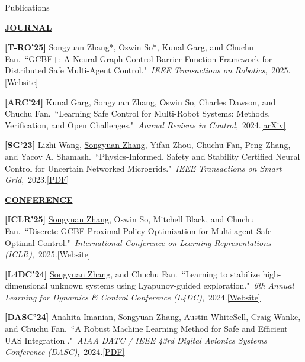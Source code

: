\documentclass{resume} %
\newcommand{\paperItem}[4]{#1.~``#2."~\textit{#3},~#4.}%
\newcommand{\me}{\underline{Songyuan Zhang}}
\newcommand{\meshort}{\textbf{S. Zhang}}
\newcommand{\person}[2]{#1}
\begin{document}
	\begin{rSection}{Publications}
		\item[] \textbf{\underline{JOURNAL}}
		\vspace{5pt}
		{
			\item {\bf [T-RO'25]}
			\paperItem{\person{\me*}{\meshort}, \person{Oswin So*}{O. So}, \person{Kunal Garg}{K. Garg}, and \person{Chuchu Fan}{C. Fan}}{GCBF+: A Neural Graph Control Barrier Function Framework for Distributed Safe Multi-Agent Control}{IEEE Transactions on Robotics}{2025}{\href{https://mit-realm.github.io/gcbfplus/}{[Website]}}
			\item {\bf [ARC'24]}
			\paperItem{\person{Kunal Garg}{K. Garg}, \person{\me}{\meshort}, \person{Oswin So}{O. So}, \person{Charles Dawson}{C. Dawson}, and \person{Chuchu Fan}{C. Fan}}{Learning Safe Control for Multi-Robot Systems: Methods, Verification, and Open Challenges}{Annual Reviews in Control}{2024}{\href{https://arxiv.org/abs/2311.13714}{[arXiv]}}
			\item {\bf [SG'23]}
			\paperItem{\person{Lizhi Wang}{L. Wang}, \person{\me}{\meshort}, \person{Yifan Zhou}{Y. Zhou}, \person{Chuchu Fan}{C. Fan}, \person{Peng Zhang}{P. Zhang}, and \person{Yacov A. Shamash}{YA. Shamash}}{Physics-Informed, Safety and Stability Certified Neural Control for Uncertain Networked Microgrids}{IEEE Transactions on Smart Grid}{2023}{\href{https://ieeexplore.ieee.org/stamp/stamp.jsp?arnumber=10233047}{[PDF]}}
		}
		\vspace{5pt}
		\item[] \textbf{\underline{CONFERENCE}}
		\vspace{5pt}
		{	
			\item {\bf [ICLR'25]}
			\paperItem{\person{\me}{\meshort}, \person{Oswin So}{O. So}, \person{Mitchell Black}{M. Black}, and \person{Chuchu Fan}{C. Fan}}{Discrete GCBF Proximal Policy Optimization for Multi-agent Safe Optimal Control}{International Conference on Learning Representations (ICLR)}{2025}{\href{https://mit-realm.github.io/dgppo/}{[Website]}}
			\item {\bf [L4DC'24]}
			\paperItem{\person{\me}{\meshort}, and \person{Chuchu Fan}{C. Fan}}{Learning to stabilize high-dimensional unknown systems using Lyapunov-guided exploration}{6th Annual Learning for Dynamics \& Control Conference (L4DC)}{2024}{\href{https://mit-realm.github.io/lyge-website/}{[Website]}}
			\item {\bf [DASC'24]}
			\paperItem{\person{Anahita Imanian}{A. Imanian}, \person{\me}{\meshort}, \person{Austin WhiteSell}{A. WhiteSell}, \person{Craig Wanke}{C. Wanke}, and \person{Chuchu Fan}{C. Fan}}{A Robust Machine Learning Method for Safe and Efficient UAS Integration }{AIAA DATC / IEEE 43rd Digital Avionics Systems Conference (DASC)}{2024}{\href{https://ieeexplore.ieee.org/abstract/document/10749515}{[PDF]}}
}
\end{rSection}
\end{document}

